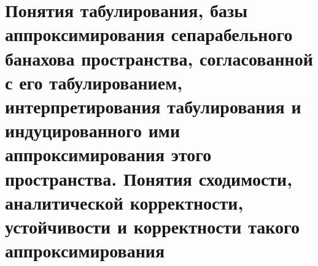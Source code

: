 \documentclass[__main__.tex]{subfiles}
\begin{document}
\section{Понятия табулирования, базы аппроксимирования сепарабельного банахова пространства, согласованной с его табулированием, интерпретирования табулирования и индуцированного ими аппроксимирования этого пространства. Понятия сходимости, аналитической корректности, устойчивости и корректности такого аппроксимирования}
\end{document}
